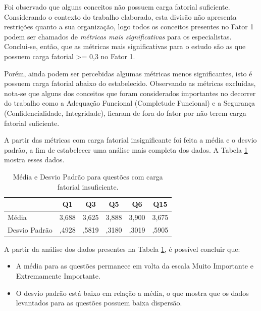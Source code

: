 Foi observado que alguns conceitos não possuem carga fatorial suficiente. Considerando o contexto do trabalho elaborado, esta divisão não apresenta restrições quanto a sua organização, logo todos os conceitos presentes no Fator 1 podem ser chamados de \textit{métricas mais significativas} para os especialistas. Conclui-se, então, que as métricas mais significativas para o estudo são as que possuem carga fatorial >= 0,3 no Fator 1. 

Porém, ainda podem ser percebidas algumas métricas menos significantes, isto é possuem carga fatorial abaixo do estabelecido. Observando as métricas excluídas, nota-se que alguns dos conceitos que foram considerados importantes no decorrer do trabalho como a Adequação Funcional (Completude Funcional) e a Segurança (Confidencialidade, Integridade), ficaram de fora do fator por não terem carga fatorial suficiente. 

A partir das métricas com carga fatorial insignificante foi feita a média e o desvio padrão, a fim de estabelecer uma análise mais completa dos dados. A Tabela  \ref{MediaExcluidos} mostra esses dados.



\begin{table}[htbp]
  \centering
  \caption{Média e Desvio Padrão para questões com carga fatorial insuficiente.}
    \begin{tabular}{llrrrrr}
    \toprule
    \multicolumn{2}{l}{} & \multicolumn{1}{c}{Q1} & \multicolumn{1}{c}{Q3} & \multicolumn{1}{c}{Q5} & \multicolumn{1}{c}{Q6} & \multicolumn{1}{c}{Q15} \\
    \midrule
    \multicolumn{2}{l}{Média} & 3,688 & 3,625 & 3,888 & 3,900 & 3,675 \\
    \multicolumn{2}{l}{Desvio Padrão} & ,4928 & ,5819 & ,3180 & ,3019 & ,5905 \\
    \bottomrule
    \end{tabular}%
  \label{MediaExcluidos}%
\end{table}%

A partir da análise dos dados presentes na Tabela \ref{MediaExcluidos}, é possível concluir que:


\begin{itemize}
\item A média para as questões permanece em volta da escala Muito Importante e Extremamente Importante.
\item O desvio padrão está baixo em relação a média, o que mostra que os dados levantados para as questões possuem baixa dispersão. 
\end{itemize}

